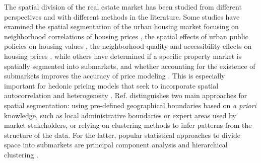 The spatial division of the real estate market has been studied from different perspectives and with different methods in the literature. Some studies have examined the spatial segmentation of the urban housing market focusing on neighborhood correlations of housing prices \cite{palm1978spatial}, the spatial effects of urban public policies on housing values \cite{baumont2009spatial}, the neighborhood quality and accessibility effects on housing prices \cite{dubin1992spatial}, while others have determined if a specific property market is spatially segmented into submarkets, and whether accounting for the existence of submarkets improves the accuracy of price modeling \cite{keskin2017defining,usman2021priori}. This is especially important for hedonic pricing models that seek to incorporate spatial autocorrelation and heterogeneity \cite{usman2021priori,paez2009recent,bitter2007incorporating, case2004modeling}. Ref. \cite{hu2022NovelApproach} distinguishes two main approaches for spatial segmentation: using pre-defined geographical boundaries based on \textit{a priori} knowledge, such as local administrative boundaries or expert areas used by market stakeholders, or relying on clustering methods to infer patterns from the structure of the data. For the latter, popular statistical approaches to divide space into submarkets are principal component analysis and hierarchical clustering \cite{goodman1998housing,bourassa1999defining,bourassa2003housing}.

